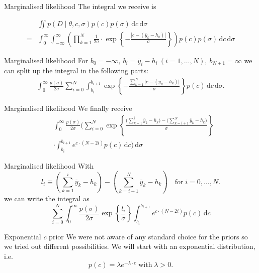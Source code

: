 \documentclass{beamer}
\newcommand{\dx}{\, \mathrm{d}}
\begin{document}
	\begin{frame}{Marginalised likelihood}
		The integral we receive is

		\begin{align*}
    		&\iint p(D \mid \theta, c, \sigma) p(c) p(\sigma) \dx c \dx \sigma \\
    		=& \int_0^{\infty} \int_{-\infty}^{\infty} \left( \prod_{k = 1}^N 					\frac{1}{2\sigma} \cdot \exp \left\{- \frac{|c - (\overline{y}_k 
    		-h_k)|} {\sigma} \right\} \right) p(c) p(\sigma) \dx c \dx \sigma
		\end{align*}
	\end{frame}
	
	\begin{frame}{Marginalised likelihood}
		For $b_0 = -\infty, \ b_i = \overline{y}_i - h_i \ (i = 1, \ldots, N), \
		b_{N+1} = \infty$ we can split up the integral in the following parts:
		\begin{align*}
    		\int_0^{\infty} \frac{p(\sigma)}{2\sigma} \sum_{i = 0}^N 
    		\int_{b_i}^{b_{i+1}} \exp \left\{- \frac{\sum_{k = 1}^N \lvert c -
    		(\overline{y}_k - h_k) \lvert} {\sigma} \right\} p(c)\dx c \dx \sigma.
		\end{align*}
	\end{frame}
	
	\begin{frame}{Marginalised likelihood}
		We finally receive
		\begin{align*}
    		&\int_0^\infty \frac{p(\sigma)}{2\sigma} \Biggl( \sum_{i = 0}^N 
    		\exp \left\{\frac{\bigl( \sum_{k = 1}^i \overline{y}_k - h_k \bigr) - 
    		\bigl( \sum_{k = i + 1}^N \overline{y}_k - h_k \bigr)}{\sigma}
    		\right\} \\
    		&\cdot \int_{b_i}^{b_{i + 1}} e^{c \cdot (N - 2i)} p(c) \dx c \Biggr) 
    		\dx \sigma
		\end{align*}
	\end{frame}
	
	\begin{frame}{Marginalised likelihood}
		With
		\[
			l_i \equiv \left( \sum_{k = 1}^i \overline{y}_k - h_k \right ) - 
			\left( \sum_{k = i + 1}^N \overline{y}_k - h_k \right ) \quad 
			\text{for} \; i = 0, \ldots, N.
		\]
		we can write the integral as
		\[
			\sum_{i = 0}^N \int_0^\infty \frac{p(\sigma)}{2\sigma} \exp \left \{
			\frac{l_i}{\sigma} \right \} \int_{b_i}^{b_{i + 1}} e^{c \cdot 
			(N - 2i)} p(c) \dx c
		\]
	\end{frame}
	
	\begin{frame}{Exponential $c$ prior}
		We were not aware of any standard choice for the priors so we tried out 
		different possibilities. We will start with an exponential distribution, 
		i.e.
		\[		
			p(c) = \lambda e^{-\lambda\cdot c} \; \text{with} \; \lambda > 0.
		\]
	\end{frame}
	
\end{document}
